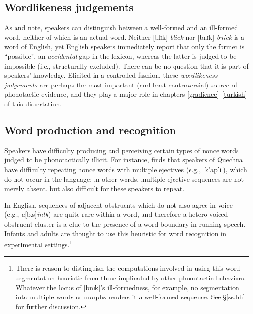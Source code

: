 \subsection{Wordlikeness judgements}

As \citet{Halle1962} and \citet{Chomsky1965} note, speakers can distinguish between a well-formed and an ill-formed word, neither of which is an actual word.
Neither [blɪk] \emph{blick} nor [bnɪk] \emph{bnick} is a word of English, yet English speakers immediately report that only the former is ``possible'', an \emph{accidental} gap in the lexicon, whereas the latter is judged to be impossible (i.e., structurally excluded).
There can be no question that it is part of speakers' knowledge.
Elicited in a controlled fashion, these \emph{wordlikeness judgements} are perhaps the most important (and least controversial) source of phonotactic evidence, and they play a major role in chapters \ref{gradience}--\ref{turkish} of this dissertation.

\subsection{Word production and recognition}
\label{ss:wpr}

Speakers have difficulty producing \citep[e.g.,][]{Davidson2006a,Davidson2010,Rose2007,Vitevitch1997} and perceiving \citep{Dupoux1999,Kabak2007a,Massaro1983} certain types of nonce words judged to be phonotactically illicit.
For instance, \citet{GallagherInPress} finds that speakers of Quechua have difficulty repeating nonce words with multiple ejectives (e.g., [k'ap'i]), which do not occur in the language;
in other words, multiple ejective sequences are not merely absent, but also difficult for these speakers to repeat.

In English, sequences of adjacent obstruents which do not also agree in voice (e.g., \emph{a}[b.s]\emph{inth}) are quite rare within a word, and therefore a hetero-voiced obstruent cluster is a clue to the presence of a word boundary in running speech.
Infants \citep[e.g.,][]{Mattys2001b} and adults \citep{McQueen1998b,Norris1997} are thought to use this heuristic for word recognition in experimental settings.\footnote{
    There is reason to distinguish the computations involved in using this word segmentation heuristic from those implicated by other phonotactic behaviors.
    Whatever the locus of [bnɪk]'s ill-formedness, for example, no segmentation into multiple words or morphs renders it a well-formed sequence.
    See \S\ref{ss:bh} for further discussion.}

